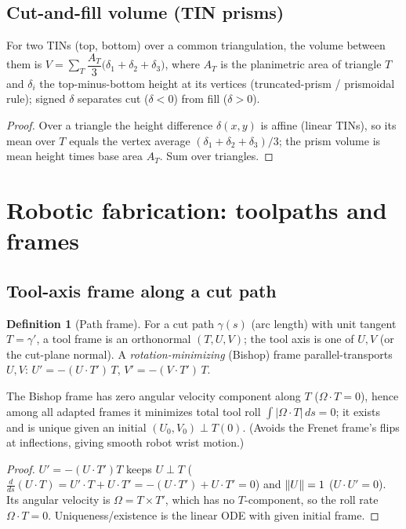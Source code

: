 \documentclass[11pt]{article}
\theoremstyle{definition}\newtheorem{definition}{Definition}[section]
\theoremstyle{plain}\newtheorem{theorem}{Theorem}[section]
\begin{document}
\subsection{Cut-and-fill volume (TIN prisms)}
\begin{proposition}
For two TINs (top, bottom) over a common triangulation, the volume between them is
$V=\sum_{T}\dfrac{A_T}{3}\big(\delta_{1}+\delta_2+\delta_3\big)$, where $A_T$ is the planimetric area of
triangle $T$ and $\delta_i$ the top-minus-bottom height at its vertices (truncated-prism / prismoidal rule);
signed $\delta$ separates cut ($\delta<0$) from fill ($\delta>0$).
\end{proposition}
\begin{proof}
Over a triangle the height difference $\delta(x,y)$ is affine (linear TINs), so its mean over $T$ equals the
vertex average $(\delta_1+\delta_2+\delta_3)/3$; the prism volume is mean height times base area $A_T$. Sum
over triangles.
\end{proof}

\section{Robotic fabrication: toolpaths and frames}
\subsection{Tool-axis frame along a cut path}
\begin{definition}[Path frame]
For a cut path $\gamma(s)$ (arc length) with unit tangent $T=\gamma'$, a tool frame is an orthonormal
$(T,U,V)$; the tool axis is one of $U,V$ (or the cut-plane normal). A \emph{rotation-minimizing} (Bishop)
frame parallel-transports $U,V$: $U'=-(U\cdot T')\,T$, $V'=-(V\cdot T')\,T$.
\end{definition}
\begin{proposition}
The Bishop frame has zero angular velocity component along $T$ ($\Omega\cdot T=0$), hence among all adapted
frames it minimizes total tool roll $\int|\Omega\cdot T|\,ds=0$; it exists and is unique given an initial
$(U_0,V_0)\perp T(0)$. (Avoids the Frenet frame's flips at inflections, giving smooth robot wrist motion.)
\end{proposition}
\begin{proof}
$U'=-(U\cdot T')T$ keeps $U\perp T$ ($\frac{d}{ds}(U\cdot T)=U'\cdot T+U\cdot T'=-(U\cdot T')+U\cdot T'=0$) and
$\lVert U\rVert=1$ ($U\cdot U'=0$). Its angular velocity is $\Omega=T\times T'$, which has no $T$-component, so the
roll rate $\Omega\cdot T=0$. Uniqueness/existence is the linear ODE with given initial frame.
\end{proof}
\end{document}

